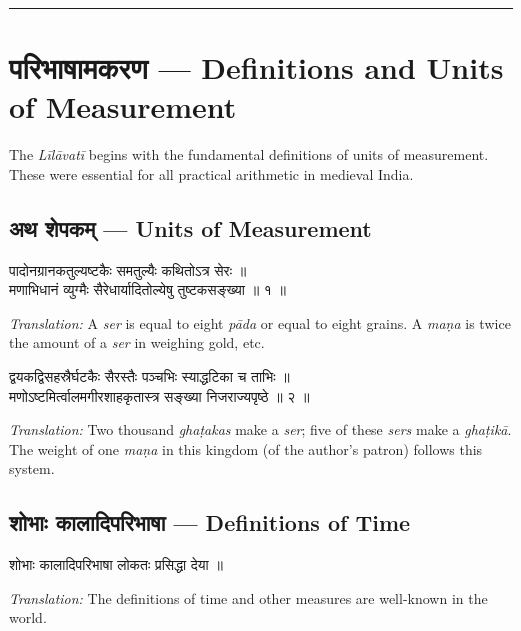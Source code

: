 \documentclass[11pt,a4paper]{book}
\newcommand{\longline}{\noindent\rule{\textwidth}{0.4pt}}
\newenvironment{sanskritverse}{
  \begin{center}
  \begin{minipage}{0.92\textwidth}
  \devanagarifont
  \centering
}{
  \end{minipage}
  \end{center}
  \vspace{0.5em}
}
\begin{document}
\longline

\chapter{परिभाषामकरण — Definitions and Units of Measurement}
\label{chap:paribhasha}

The \textit{Līlāvatī} begins with the fundamental definitions of units of measurement. These were essential for all practical arithmetic in medieval India.

\section{अथ शेपकम् — Units of Measurement}

\begin{sanskritverse}
पादोनग्रानकतुल्यष्टकैः समतुल्यैः कथितोऽत्र सेरः ॥\\
मणाभिधानं व्युग्मैः सैरेधार्यादितोल्येषु तुष्टकसङ्ख्या ॥ १ ॥
\end{sanskritverse}

\textit{Translation:} A \textit{ser} is equal to eight \textit{pāda} or equal to eight grains. A \textit{maṇa} is twice the amount of a \textit{ser} in weighing gold, etc.

\begin{sanskritverse}
द्वयकद्विसहस्रैर्घटकैः सैरस्तैः पञ्चभिः स्याद्धटिका च ताभिः ॥\\
मणोऽष्टमिर्त्वालमगीरशाहकृतास्त्र सङ्ख्या निजराज्यपृष्ठे ॥ २ ॥
\end{sanskritverse}

\textit{Translation:} Two thousand \textit{ghaṭakas} make a \textit{ser}; five of these \textit{sers} make a \textit{ghaṭikā}. The weight of one \textit{maṇa} in this kingdom (of the author's patron) follows this system.

\section{शोभाः कालादिपरिभाषा — Definitions of Time}

\begin{sanskritverse}
शोभाः कालादिपरिभाषा लोकतः प्रसिद्धा देया ॥
\end{sanskritverse}

\textit{Translation:} The definitions of time and other measures are well-known in the world.
\end{document}
